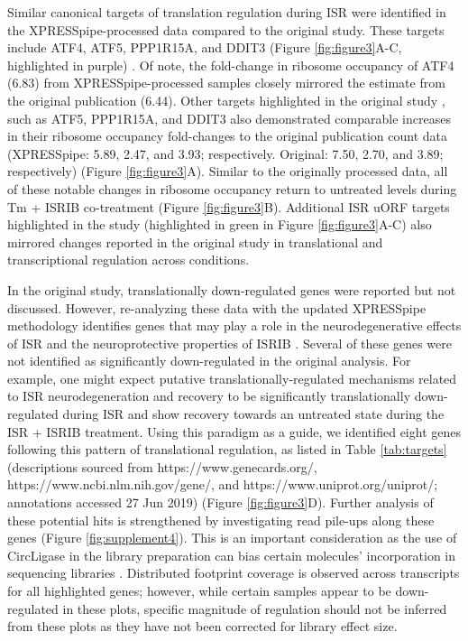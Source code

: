 \documentclass[10pt, oneside]{article}
\begin{document}
Similar canonical targets of translation regulation during ISR were identified in the XPRESSpipe-processed data compared to the original study. These targets include ATF4, ATF5, PPP1R15A, and DDIT3 (Figure \ref{fig:figure3}A-C, highlighted in purple) \cite{isrib_riboseq}. Of note, the fold-change in ribosome occupancy of ATF4 (6.83) from XPRESSpipe-processed samples closely mirrored the estimate from the original publication (6.44). Other targets highlighted in the original study \cite{isrib_riboseq}, such as ATF5, PPP1R15A, and DDIT3 also demonstrated comparable increases in their ribosome occupancy fold-changes to the original publication count data (XPRESSpipe: 5.89, 2.47, and 3.93; respectively. Original: 7.50, 2.70, and 3.89; respectively) (Figure \ref{fig:figure3}A). Similar to the originally processed data, all of these notable changes in ribosome occupancy return to untreated levels during Tm + ISRIB co-treatment (Figure \ref{fig:figure3}B). Additional ISR uORF targets highlighted in the study (highlighted in green in Figure \ref{fig:figure3}A-C) also mirrored changes reported in the original study in translational and transcriptional regulation across conditions. \par

In the original study, translationally down-regulated genes were reported but not discussed. However, re-analyzing these data with the updated XPRESSpipe methodology identifies genes that may play a role in the neurodegenerative effects of ISR and the neuroprotective properties of ISRIB \cite{isrib_neuroprotective,isrib_neuroprotective2,isrib_neuroprotective3,isrib_neuroprotective4}. Several of these genes were not identified as significantly down-regulated in the original analysis. For example, one might expect putative translationally-regulated mechanisms related to ISR neurodegeneration and recovery to be significantly translationally down-regulated during ISR and show recovery towards an untreated state during the ISR + ISRIB treatment. Using this paradigm as a guide, we identified eight genes following this pattern of translational regulation, as listed in Table \ref{tab:targets} (descriptions sourced from https://www.genecards.org/, https://www.ncbi.nlm.nih.gov/gene/, and https://www.uniprot.org/uniprot/; annotations accessed 27 Jun 2019) (Figure \ref{fig:figure3}D). Further analysis of these potential hits is strengthened by investigating read pile-ups along these genes (Figure \ref{fig:supplement4}). This is an important consideration as the use of CircLigase in the library preparation can bias certain molecules' incorporation in sequencing libraries \cite{circligase_bias}. Distributed footprint coverage is observed across transcripts for all highlighted genes; however, while certain samples appear to be down-regulated in these plots, specific magnitude of regulation should not be inferred from these plots as they have not been corrected for library effect size. \par
\end{document}
